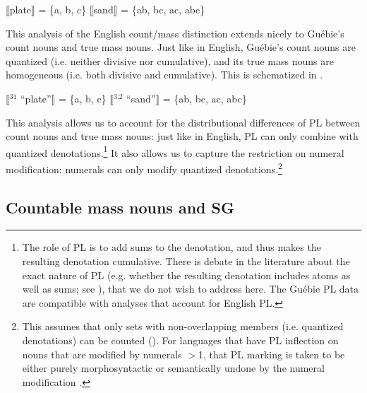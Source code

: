 \documentclass[output=paper,colorlinks,citecolor=brown]{langscibook}
\begin{document}
\ea%
    \label{ex:sande:17}
    \ea%
    \label{ex:sande:17a}
    $\llbracket$plate$\rrbracket$ = \{a, b, c\}
    \ex%
    \label{ex:sande:17b}
    $\llbracket$sand$\rrbracket$ = \{ab, bc, ac, abc\}
    \z
\z

This analysis of the English count/mass distinction extends nicely to Guébie's count nouns and true mass nouns. Just like in English, Guébie's count nouns are quantized (i.e. neither divisive nor cumulative), and its true mass nouns are homogeneous (i.e. both divisive and cumulative). This is schematized in .

\ea%
    \label{ex:sande:18}
    \ea%
    \label{ex:sande:18a}
    $\llbracket$$^{31}$ ``plate''$\rrbracket$ = \{a, b, c\}
    \ex%
    \label{ex:sande:18b}
    $\llbracket$$^{3.2}$ ``sand''$\rrbracket$ = \{ab, bc, ac, abc\}
    \z
\z

This analysis allows us to account for the distributional differences of PL between count nouns and true mass nouns: just like in English, PL can only combine with quantized denotations.\footnote{The role of PL is to add sums to the denotation, and thus makes the resulting denotation cumulative. There is debate in the literature about the exact nature of PL (e.g. whether the resulting denotation includes atoms as well as sums; see \citealt{SauerlandEtAl2005, FarkasSwart2010}), that we do not wish to address here. The Guébie PL data are compatible with analyses that account for English PL.} It also allows us to capture the restriction on numeral modification: numerals can only modify quantized denotations.\footnote{This assumes that only sets with non-overlapping members (i.e. quantized denotations) can be counted (\citealt{Chierchia1998, Landman2011}). For languages that have PL inflection on nouns that are modified by numerals $>$1, that PL marking is taken to be either purely morphosyntactic \citep{Krifka1989} or semantically undone by the numeral modification \citep{Chierchia1998}.}


\subsection{Countable mass nouns and SG}\label{sec:sande:3.2}
\end{document}
